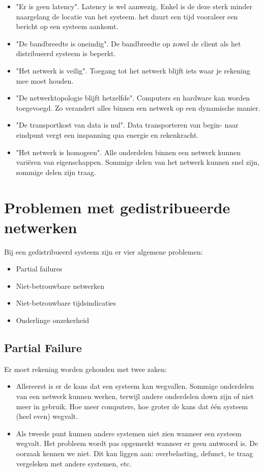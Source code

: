 \documentclass[a4paper,10pt,twoside]{report}
\begin{document}
\begin{itemize}
	\item "Er is geen latency". Latency is wel aanwezig. Enkel is de deze sterk minder naargelang de locatie van het systeem. het duurt een tijd vooraleer een bericht op een systeem aankomt.
	\item "De bandbreedte is oneindig". De bandbreedte op zowel de client als het distribueerd systeem is beperkt.
	\item "Het netwerk is veilig". Toegang tot het netwerk blijft iets waar je rekening mee moet houden.
	\item "De netwerktopologie blijft hetzelfde". Computers en hardware kan worden toegevoegd. Zo verandert alles binnen een netwerk op een dynamische manier.
	\item "De transportkost van data is nul". Data transporteren van begin- naar eindpunt vergt een inspanning qua energie en rekenkracht.
	\item "Het netwerk is homogeen". Alle onderdelen binnen een netwerk kunnen variëren van eigenschappen. Sommige delen van het netwerk kunnen snel zijn, sommige delen zijn traag.
\end{itemize}

\section{Problemen met gedistribueerde netwerken}

Bij een gedistribueerd systeem zijn er vier algemene problemen:

\begin{itemize}
	\item Partial failures
	\item Niet-betrouwbare netwerken
	\item Niet-betrouwbare tijdsindicaties
	\item Onderlinge onzekerheid
\end{itemize}

\subsection{Partial Failure}

Er moet rekening worden gehouden met twee zaken: 

\begin{itemize}
	\item Allereerst is er de kans dat een systeem kan wegvallen. Sommige onderdelen van een netwerk kunnen werken, terwijl andere onderdelen down zijn of niet meer in gebruik. Hoe meer computers, hoe groter de kans dat één systeem (heel even) wegvalt.
	\item Als tweede punt kunnen andere systemen niet zien wanneer een systeem wegvalt. Het probleem wordt pas opgemerkt wanneer er geen antwoord is. De oorzaak kennen we niet. Dit kan liggen aan: overbelasting, defunct, te traag vergeleken met andere systemen, etc.
\end{itemize}
\end{document}
